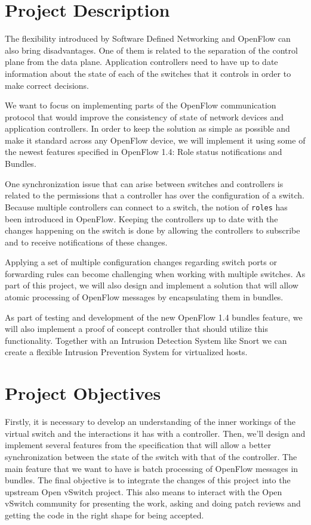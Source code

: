 \section{Project Description}
\label{sec:proj}

The flexibility introduced by Software Defined Networking and OpenFlow can also bring disadvantages. One
of them is related to the separation of the control plane from the data plane. Application controllers
need to have up to date information about the state of each of the switches that it controls in order to
make correct decisions.

We want to focus on implementing parts of the OpenFlow communication protocol that would improve
the consistency of state of network devices and application controllers. In order to keep the solution
as simple as possible and make it standard across any OpenFlow device, we will implement it using
some of the newest features specified in OpenFlow 1.4\cite{of14}: Role status notifications and Bundles.

One synchronization issue that can arise between switches and controllers is related to the permissions
that a controller has over the configuration of a switch. Because multiple controllers can connect to a
switch, the notion of \texttt{roles} has been introduced in OpenFlow. Keeping the controllers up to date
with the changes happening on the switch is done by allowing the controllers to subscribe and to receive
notifications of these changes.

Applying a set of multiple configuration changes regarding switch ports or forwarding rules can become
challenging when working with multiple switches. As part of this project, we will also design and implement
a solution that will allow atomic processing of OpenFlow messages by encapsulating them in bundles.

As part of testing and development of the new OpenFlow 1.4 bundles feature, we will also implement a proof of concept
controller that should utilize this functionality. Together with an Intrusion Detection System like Snort\cite{snort}
we can create a flexible Intrusion Prevention System for virtualized hosts.

\section{Project Objectives}
\label{sub-sec:proj-objectives}

Firstly, it is necessary to develop an understanding of the inner workings of the virtual switch and the interactions
it has with a controller. Then, we'll design and implement several features from the specification that will
allow a better synchronization between the state of the switch with that of the controller. The main feature that
we want to have is batch processing of OpenFlow messages in bundles. The final objective is to integrate the changes of
this project into the upstream Open vSwitch project. This also means to interact
with the Open vSwitch community for presenting the work, asking and doing patch reviews and getting the code in
the right shape for being accepted.

